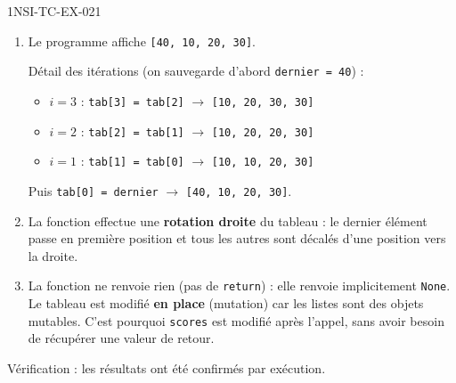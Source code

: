 \begin{corrige}{1NSI-TC-EX-021}
\begin{enumerate}
  \item Le programme affiche \lstinline{[40, 10, 20, 30]}.

  Détail des itérations (on sauvegarde d'abord \lstinline{dernier = 40}) :
  \begin{itemize}
    \item $i=3$ : \lstinline{tab[3] = tab[2]} $\to$ \lstinline{[10, 20, 30, 30]}
    \item $i=2$ : \lstinline{tab[2] = tab[1]} $\to$ \lstinline{[10, 20, 20, 30]}
    \item $i=1$ : \lstinline{tab[1] = tab[0]} $\to$ \lstinline{[10, 10, 20, 30]}
  \end{itemize}
  Puis \lstinline{tab[0] = dernier} $\to$ \lstinline{[40, 10, 20, 30]}.

  \item La fonction effectue une \textbf{rotation droite} du tableau : le dernier élément passe en première position et tous les autres sont décalés d'une position vers la droite.

  \item La fonction ne renvoie rien (pas de \lstinline{return}) : elle renvoie implicitement \lstinline{None}. Le tableau est modifié \textbf{en place} (mutation) car les listes sont des objets mutables. C'est pourquoi \lstinline{scores} est modifié après l'appel, sans avoir besoin de récupérer une valeur de retour.
\end{enumerate}

Vérification : les résultats ont été confirmés par exécution.
\end{corrige}

